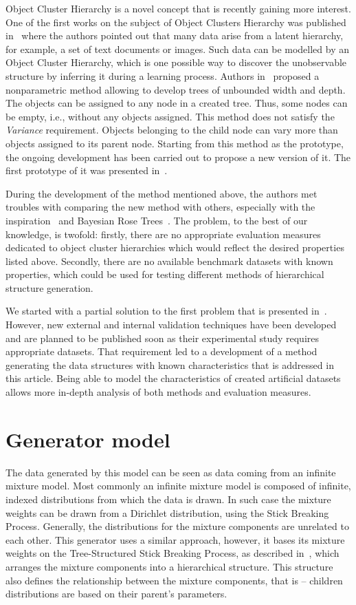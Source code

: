 \documentclass{article}
\begin{document}
Object Cluster Hierarchy is a novel concept that is recently gaining more interest. One of the first works on the subject of Object Clusters Hierarchy was published in~\cite{ghahramani2010tree} where the authors pointed out that many data arise from a latent hierarchy, for example, a set of text documents or images. Such data can be modelled by an Object Cluster Hierarchy, which is one possible way to discover the unobservable structure by inferring it during a learning process. Authors in~\cite{ghahramani2010tree} proposed a nonparametric method allowing to develop trees of unbounded width and depth. The objects can be assigned to any node in a created tree. Thus, some nodes can be empty, i.e., without any objects assigned. This method does not satisfy the \textit{Variance} requirement. Objects belonging to the child node can vary more than objects assigned to its parent node. Starting from this method as the prototype, the ongoing development has been carried out to propose a new version of it. The first prototype of it was presented in~\cite{Spytkowski2016}.

    During the development of the method mentioned above, the authors met troubles with comparing the new method with others, especially with the inspiration~\cite{ghahramani2010tree} and Bayesian Rose Trees~\cite{DBLP:journals/corr/abs-1203-3468}. The problem, to the best of our knowledge, is twofold: firstly, there are no appropriate evaluation measures dedicated to object cluster hierarchies which would reflect the desired properties listed above. Secondly, there are no available benchmark datasets with known properties, which could be used for testing different methods of hierarchical structure generation.
    
We started with a partial solution to the first problem that is presented in~\cite{Spytkowski2016}. However, new external and internal validation techniques have been developed and are planned to be published soon as their experimental study requires appropriate datasets. That requirement led to a development of a method generating the data structures with known characteristics that is addressed in this article. Being able to model the characteristics of created artificial datasets allows more in-depth analysis of both methods and evaluation measures.
%
\section{Generator model}
\label{model}
	The data generated by this model	 can be seen as data coming from an infinite mixture model. Most commonly an infinite mixture model is composed of infinite, indexed distributions from which the data is drawn. In such case the mixture weights can be drawn from a Dirichlet distribution, using the Stick Breaking Process. Generally, the distributions for the mixture components are unrelated to each other. This generator uses a similar approach, however, it bases its mixture weights on the Tree-Structured Stick Breaking Process, as described in~\cite{ghahramani2010tree}, which arranges the mixture components into a hierarchical structure. This structure also defines the relationship between the mixture components, that is -- children distributions are based on their parent's parameters.
    
\end{document}

